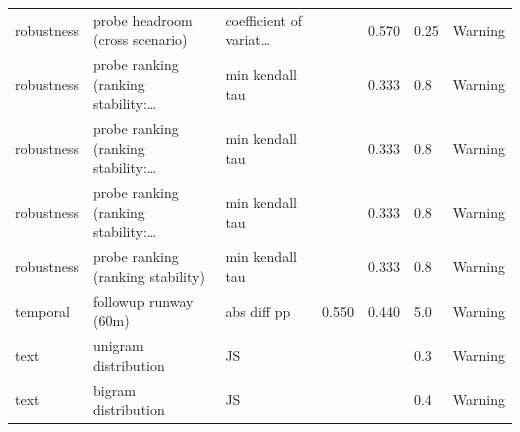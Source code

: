 \begin{table}[htbp]
\begin{tabularx}{\textwidth}{>{\raggedright\arraybackslash}X>{\raggedright\arraybackslash}X>{\raggedright\arraybackslash}Xrrll}
robustness & probe headroom (cross scenario) & coefficient of variat… &  & 0.570 & 0.25 & Warning \\
robustness & probe ranking (ranking stability:… & min kendall tau &  & 0.333 & 0.8 & Warning \\
robustness & probe ranking (ranking stability:… & min kendall tau &  & 0.333 & 0.8 & Warning \\
robustness & probe ranking (ranking stability:… & min kendall tau &  & 0.333 & 0.8 & Warning \\
robustness & probe ranking (ranking stability) & min kendall tau &  & 0.333 & 0.8 & Warning \\
temporal & followup runway (60m) & abs diff pp & 0.550 & 0.440 & 5.0 & Warning \\
text & unigram distribution & JS &  &  & 0.3 & Warning \\
text & bigram distribution & JS &  &  & 0.4 & Warning \\
\bottomrule
\end{tabularx}
\end{table}
